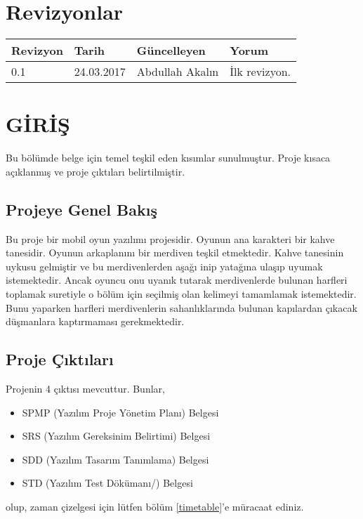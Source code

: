 \documentclass[12pt,a4paper]{article}
\begin{document}
   
   \newpage

   \section*{Revizyonlar}
   \begin{center}
      \begin{tabu} to 1.0\textwidth {| X[l] |  X[c] |  X[c] | X[c] |}
      \hline
      Revizyon & Tarih & Güncelleyen & Yorum \\[0.5ex]
      \hline{} & 24.03.2017 & Abdullah Akalın & İlk revizyon. \\
      \hline
      \end{tabu}
   \end{center}
   \newpage


   \tableofcontents
   \newpage


   \section{GİRİŞ}
   Bu bölümde belge için temel teşkil eden kısımlar sunulmuştur. Proje kısaca açıklanmış ve proje çıktıları belirtilmiştir.

   \subsection{Projeye Genel Bakış}
   Bu proje bir mobil oyun yazılımı projesidir. Oyunun ana karakteri bir kahve tanesidir. Oyunun arkaplanını bir merdiven teşkil etmektedir. Kahve tanesinin uykusu gelmiştir ve bu merdivenlerden aşağı inip yatağına ulaşıp uyumak istemektedir. Ancak oyuncu onu uyanık tutarak merdivenlerde bulunan harfleri toplamak suretiyle o bölüm için seçilmiş olan kelimeyi tamamlamak istemektedir. Bunu yaparken harfleri merdivenlerin sahanlıklarında bulunan kapılardan çıkacak düşmanlara kaptırmaması gerekmektedir.

   \subsection{Proje Çıktıları}
   Projenin 4 çıktısı mevcuttur. Bunlar,
   \begin{itemize}
      \item SPMP (Yazılım Proje Yönetim Planı) Belgesi
      \item SRS (Yazılım Gereksinim Belirtimi) Belgesi
      \item SDD (Yazılım Tasarım Tanımlama) Belgesi
      \item STD (Yazılım Test Dökümanı/) Belgesi
   \end{itemize}
   olup, zaman çizelgesi için lütfen bölüm \ref{timetable}'e müracaat ediniz.
\end{document}
